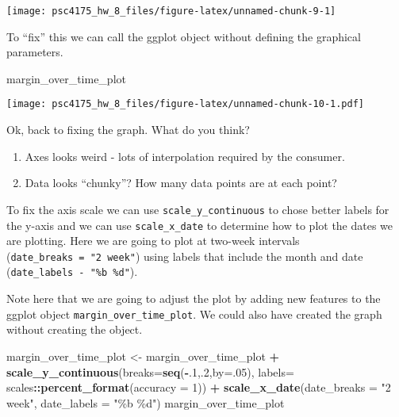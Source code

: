 \documentclass[
]{article}
\newenvironment{Shaded}{\begin{snugshade}}{\end{snugshade}}
\newcommand{\AttributeTok}[1]{\textcolor[rgb]{0.13,0.29,0.53}{#1}}
\newcommand{\DecValTok}[1]{\textcolor[rgb]{0.00,0.00,0.81}{#1}}
\newcommand{\FunctionTok}[1]{\textcolor[rgb]{0.13,0.29,0.53}{\textbf{#1}}}
\newcommand{\NormalTok}[1]{#1}
\newcommand{\OtherTok}[1]{\textcolor[rgb]{0.56,0.35,0.01}{#1}}
\newcommand{\SpecialCharTok}[1]{\textcolor[rgb]{0.81,0.36,0.00}{\textbf{#1}}}
\newcommand{\StringTok}[1]{\textcolor[rgb]{0.31,0.60,0.02}{#1}}
\begin{document}
\begin{center}\texttt{[image: psc4175\_hw\_8\_files/figure-latex/unnamed-chunk-9-1]} \end{center}

To ``fix'' this we can call the ggplot object without defining the
graphical parameters.

\begin{Shaded}
\begin{Highlighting}[]
\NormalTok{margin\_over\_time\_plot}
\end{Highlighting}
\end{Shaded}

\texttt{[image: psc4175\_hw\_8\_files/figure-latex/unnamed-chunk-10-1.pdf]}

Ok, back to fixing the graph. What do you think?

\begin{enumerate}
\def\labelenumi{\arabic{enumi}.}
\item
  Axes looks weird - lots of interpolation required by the consumer.
\item
  Data looks ``chunky''? How many data points are at each point?
\end{enumerate}

To fix the axis scale we can use \texttt{scale\_y\_continuous} to chose
better labels for the y-axis and we can use \texttt{scale\_x\_date} to
determine how to plot the dates we are plotting. Here we are going to
plot at two-week intervals (\texttt{date\_breaks\ =\ "2\ week"}) using
labels that include the month and date
(\texttt{date\_labels\ -\ "\%b\ \%d"}).

Note here that we are going to adjust the plot by adding new features to
the ggplot object \texttt{margin\_over\_time\_plot}. We could also have
created the graph without creating the object.

\begin{Shaded}
\begin{Highlighting}[]
\NormalTok{margin\_over\_time\_plot }\OtherTok{\textless{}{-}}\NormalTok{ margin\_over\_time\_plot  }\SpecialCharTok{+} 
    \FunctionTok{scale\_y\_continuous}\NormalTok{(}\AttributeTok{breaks=}\FunctionTok{seq}\NormalTok{(}\SpecialCharTok{{-}}\NormalTok{.}\DecValTok{1}\NormalTok{,.}\DecValTok{2}\NormalTok{,}\AttributeTok{by=}\NormalTok{.}\DecValTok{05}\NormalTok{),}
                     \AttributeTok{labels=}\NormalTok{ scales}\SpecialCharTok{::}\FunctionTok{percent\_format}\NormalTok{(}\AttributeTok{accuracy =} \DecValTok{1}\NormalTok{)) }\SpecialCharTok{+}
    \FunctionTok{scale\_x\_date}\NormalTok{(}\AttributeTok{date\_breaks =} \StringTok{"2 week"}\NormalTok{, }\AttributeTok{date\_labels =} \StringTok{"\%b \%d"}\NormalTok{) }
\NormalTok{margin\_over\_time\_plot}
\end{Highlighting}
\end{Shaded}
\end{document}
